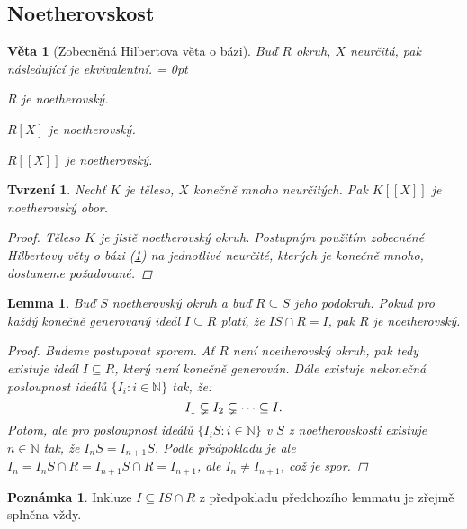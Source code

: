 \documentclass[11pt,a4paper]{article}
\newcommand\m[1]{\mathbb { #1 }} %
\newcommand\N{\m N}
\newcommand*{\ml}[1]{\[\textstyle\let\displaystyle\textstyle#1\]}	%
\newenvironment{itemsn}{%
	\enumerate%
	\itemsep = 0pt%
}{%
	\endenumerate%
}
\newcounter{numb}
\theoremstyle{definition}
\newtheorem{poznamka}[numb]{Poznámka}
\theoremstyle{plain}
\newtheorem{veta}[numb]{Věta}
\newtheorem{lemma}[numb]{Lemma}
\newtheorem{tvrzeni}[numb]{Tvrzení}
\begin{document}
\subsection{Noetherovskost}

\begin{veta}[Zobecněná Hilbertova věta o bázi] \label{thm:GHB}
	Buď $R$ okruh, $X$ neurčitá, pak následující je ekvivalentní.
	\begin{itemsn}
		\item $R$ je noetherovský.
		\item $R[X]$ je noetherovský.
		\item $R[[X]]$ je noetherovský.
	\end{itemsn}
\end{veta}

\begin{tvrzeni} \label{thm:KX_noe}
	Nechť $K$ je těleso, $X$ konečně mnoho neurčitých. Pak $K[[X]]$ je noetherovský obor.

	\begin{proof}
		Těleso $K$ je jistě noetherovský okruh. Postupným použitím zobecněné Hilbertovy věty o bázi (\ref{thm:GHB}) na jednotlivé neurčité, kterých je konečně mnoho, dostaneme požadované.
	\end{proof}
\end{tvrzeni}

\begin{lemma}
	Buď $S$ noetherovský okruh a buď $R \subseteq S$ jeho podokruh. Pokud pro každý konečně generovaný ideál $I \subseteq R$ platí, že $IS \cap R = I$, pak $R$ je noetherovský.

	\begin{proof}
		Budeme postupovat sporem. Ať $R$ není noetherovský okruh, pak tedy existuje ideál $I \subseteq R$, který není konečně generován. Dále existuje nekonečná posloupnost ideálů $\{I_i: i \in \N\}$ tak, že:
		\ml{
			I_1 \subsetneq I_2 \subsetneq \dots \subseteq I.
		}
		Potom, ale pro posloupnost ideálů $\{I_i S: i \in \N\}$ v $S$ z noetherovskosti existuje $n \in \N$ tak, že $I_n S = I_{n + 1} S$. Podle předpokladu je ale $I_n = I_n S \cap R = I_{n + 1} S \cap R = I_{n + 1}$, ale $I_n \not= I_{n+1}$, což je spor.
	\end{proof}
\end{lemma}

\begin{poznamka}
	Inkluze $I \subseteq IS \cap R$ z předpokladu předchozího lemmatu je zřejmě splněna vždy.
\end{poznamka}
\end{document}
